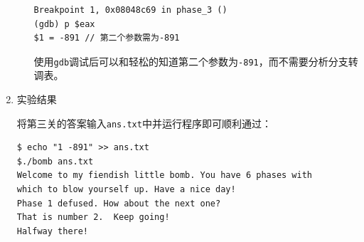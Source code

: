 \documentclass{paper}
\begin{document}
\begin{enumerate}
\begin{enumerate}
\begin{lstlisting}
Breakpoint 1, 0x08048c69 in phase_3 ()
(gdb) p $eax
$1 = -891 // 第二个参数需为-891
\end{lstlisting}

使用\verb|gdb|调试后可以和轻松的知道第二个参数为\verb|-891|，而不需要分析分支转调表。

\end{enumerate}

\item 实验结果

将第三关的答案输入\verb|ans.txt|中并运行程序即可顺利通过：

\begin{lstlisting}
$ echo "1 -891" >> ans.txt
$./bomb ans.txt
Welcome to my fiendish little bomb. You have 6 phases with
which to blow yourself up. Have a nice day!
Phase 1 defused. How about the next one?
That is number 2.  Keep going!
Halfway there!
\end{lstlisting}

\end{enumerate}
\end{document}
